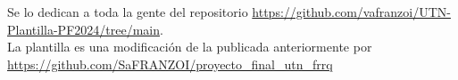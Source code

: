 Se lo dedican a toda la gente del repositorio \url{https://github.com/vafranzoi/UTN-Plantilla-PF2024/tree/main}. \\
La plantilla es una modificación de la publicada anteriormente por  \url{https://github.com/SaFRANZOI/proyecto_final_utn_frrq}
\newpage
